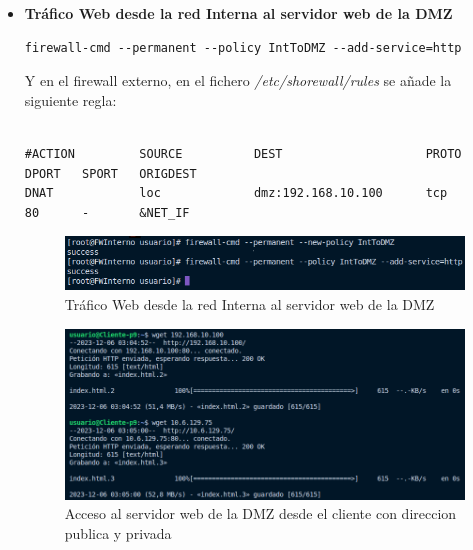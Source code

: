 \documentclass[11pt]{report}
\begin{document}
\begin{itemize}
  \item \textbf{Tráfico Web desde la red Interna al servidor web de la DMZ}
  \begin{verbatim}
firewall-cmd --permanent --policy IntToDMZ --add-service=http
  \end{verbatim}
  Y en el firewall externo, en el fichero \emph{/etc/shorewall/rules} se añade la siguiente regla:
  \\ \\
  \begin{BVerbatim}[fontsize=\fontsize{9}{10}]
#ACTION         SOURCE          DEST                    PROTO           DPORT   SPORT   ORIGDEST
DNAT            loc             dmz:192.168.10.100      tcp             80      -       &NET_IF
  \end{BVerbatim}

  \begin{figure}[H]
    \centering
    \includegraphics[scale=0.655]{img/http.png}
    \caption{Tráfico Web desde la red Interna al servidor web de la DMZ}
  \end{figure}

  \begin{figure}[H]
    \centering
    \includegraphics[scale=0.655]{img/nginx_cliente.png}
    \caption{Acceso al servidor web de la DMZ desde el cliente con direccion publica y privada}
  \end{figure}

  \cleardoublepage


\end{itemize}
\end{document}
